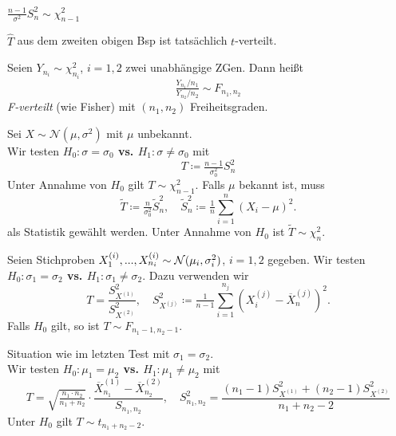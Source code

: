 \documentclass{cheat-sheet}
\newcommand{\testh}[1]{\textcolor{TestColor}{\textbf{#1}}}
\newcommand{\Normal}{\mathcal{N}} %
\begin{document}
\begin{lem}
  $\tfrac{n-1}{\sigma^2} S_n^2 \sim \chi_{n-1}^2$
\end{lem}

\begin{kor}
  $\hat{T}$ aus dem zweiten obigen Bsp ist tatsächlich $t$-verteilt.
\end{kor}

\begin{defn}
  Seien $Y_{n_i} \sim \chi_{n_i}^2$, $i = 1, 2$ zwei unabhängige ZGen.
  Dann heißt %
  \[ \tfrac{Y_{n_1} / n_1}{Y_{n_2} / n_2} \sim F_{n_1, n_2} \]
  \emph{F-verteilt} (wie Fisher) mit $(n_1, n_2)$ Freiheitsgraden.
\end{defn}


\begin{test}
  Sei $X \sim \Normal(\mu, \sigma^2)$ mit $\mu$ unbekannt. \\
  Wir testen \testh{$H_0 : \sigma = \sigma_0$ vs. $H_1 : \sigma \neq \sigma_0$} mit
  \[ T \coloneqq \tfrac{n-1}{\sigma_0^2} S_n^2 \]
  Unter Annahme von $H_0$ gilt $T \sim \chi_{n-1}^2$.
  Falls $\mu$ bekannt ist, muss
  \[
    \widetilde{T} \coloneqq \tfrac{n}{\sigma_0^2} \widetilde{S}_n^2, \quad
    \widetilde{S}_n^2 \coloneqq \tfrac{1}{n} \sum_{i=1}^n (X_i - \mu)^2.
  \]
  als Statistik gewählt werden.
  Unter Annahme von $H_0$ ist $\widetilde{T} \sim \chi_n^2$.
\end{test}

\begin{test}
  Seien Stichproben $X_1^{(i)}, \nldots, X_{n_i}^{(i)} \sim \Normal(\mu_i, \sigma_i^2)$, $i = 1, 2$ gegeben.
  Wir testen \testh{$H_0 : \sigma_1 = \sigma_2$ vs. $H_1 : \sigma_1 \neq \sigma_2$}.
  Dazu verwenden wir
  \[
    T = \frac{S_{X^{(1)}}^2}{S_{X^{(2)}}^2}, \quad
    S_{X^{(j)}}^2 \coloneqq \tfrac{1}{n-1} \sum_{i=1}^{n_j} \left( X_i^{(j)} - \overline{X}^{(j)}_n \right)^2.
  \]
  Falls $H_0$ gilt, so ist $T \sim F_{n_1-1,n_2-1}$.
\end{test}

\begin{test}
  Situation wie im letzten Test mit $\sigma_1 = \sigma_2$. \\
  Wir testen \testh{$H_0 : \mu_1 = \mu_2$ vs. $H_1 : \mu_1 \neq \mu_2$} mit
  \[
    T = \sqrt{\tfrac{n_1 \cdot n_2}{n_1 + n_2}} \cdot \frac{\overline{X}_{n_1}^{(1)} - \overline{X}_{n_2}^{(2)}}{S_{n_1,n_2}}, \quad
    S_{n_1,n_2}^2 = \frac{(n_1{-}1) S_{X^{(1)}}^2 + (n_2{-}1) S_{X^{(2)}}^2}{n_1 + n_2 - 2}
  \]
  Unter $H_0$ gilt $T \sim t_{n_1 + n_2 - 2}$.
\end{test}
\end{document}
